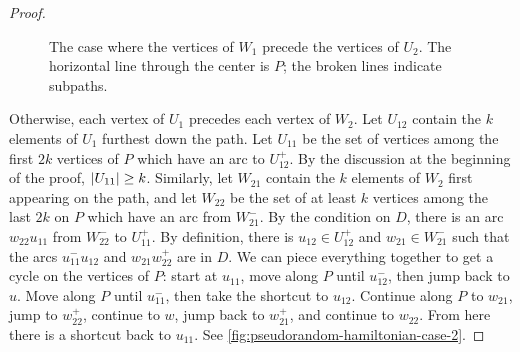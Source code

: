 \documentclass[11pt,english]{article}
\theoremstyle{plain}
\theoremstyle{definition}
\theoremstyle{definition}
\theoremstyle{plain}
\theoremstyle{plain}
\theoremstyle{plain}
\theoremstyle{plain}
\theoremstyle{remark}
\theoremstyle{remark}
\let\originalleft\left
\let\originalright\right
\renewcommand{\left}{\mathopen{}\mathclose\bgroup\originalleft}
\renewcommand{\right}{\aftergroup\egroup\originalright}
\begin{document}
\begin{proof}
\begin{figure}[H]
\begin{center}
\hspace{0.5cm}
\end{center}

\protect\caption{\label{fig:pseudorandom-hamiltonian-case-1}The case where the vertices
of $W_{1}$ precede the vertices of $U_{2}$. The horizontal line
through the center is $P$; the broken lines indicate subpaths.}
\end{figure}


Otherwise, each vertex of $U_{1}$ precedes each vertex of $W_{2}$.
Let $U_{12}$ contain the $k$ elements of $U_{1}$ furthest down
the path. Let $U_{11}$ be the set of vertices among the first $2k$
vertices of $P$ which have an arc to $U_{12}^{+}$. By the discussion
at the beginning of the proof, $\left|U_{11}\right|\ge k$. Similarly,
let $W_{21}$ contain the $k$ elements of $W_{2}$ first appearing
on the path, and let $W_{22}$ be the set of at least $k$ vertices
among the last $2k$ on $P$ which have an arc from $W_{21}^{-}$.
By the condition on $D$, there is an arc $w_{22}u_{11}$ from $W_{22}^{-}$
to $U_{11}^{+}$. By definition, there is $u_{12}\in U_{12}^{+}$
and $w_{21}\in W_{21}^{-}$ such that the arcs $u_{11}^{-}u_{12}$
and $w_{21}w_{22}^{+}$ are in $D$. We can piece everything together
to get a cycle on the vertices of $P$: start at $u_{11}$, move along
$P$ until $u_{12}^{-}$, then jump back to $u$. Move along $P$
until $u_{11}^{-}$, then take the shortcut to $u_{12}$. Continue
along $P$ to $w_{21}$, jump to $w_{22}^{+}$, continue to $w$,
jump back to $w_{21}^{+}$, and continue to $w_{22}$. From here there
is a shortcut back to $u_{11}$. See \ref{fig:pseudorandom-hamiltonian-case-2}.


\end{proof}
\end{document}
